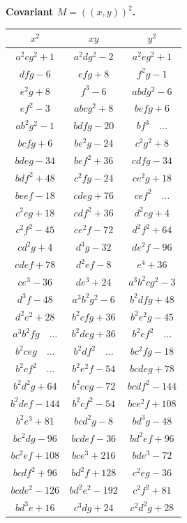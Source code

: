 \documentclass[11pt,a4paper]{article}
\theoremstyle{cayley}
\begin{document}
\textbf{Covariant $M = (\!\!(x,y)\!\!)^{2}$.}
\begin{center}
\small
\begin{tabular}{|c|c|c|}
\hline
$x^{2}$ & $xy$ & $y^{2}$ \\
\hline
$a^{2}cg^{2}+1$ & $a^{2}dg^{2}-2$ & $a^{2}eg^{2}+1$ \\
$dfg-6$ & $efg+8$ & $f^{2}g-1$ \\
$e^{2}g+8$ & $f^{3}-6$ & $abdg^{2}-6$ \\
$ef^{2}-3$ & $abcg^{2}+8$ & $befg+6$ \\
$ab^{2}g^{2}-1$ & $bdfg-20$ & $bf^{3}\quad\dots$ \\
$bcfg+6$ & $be^{2}g-24$ & $c^{2}g^{2}+8$ \\
$bdeg-34$ & $bef^{2}+36$ & $cdfg-34$ \\
$bdf^{2}+48$ & $c^{2}fg-24$ & $ce^{2}g+18$ \\
$beef-18$ & $cdeg+76$ & $cef^{2}\quad\dots$ \\
$c^{2}eg+18$ & $cdf^{2}+36$ & $d^{2}eg+4$ \\
$c^{2}f^{2}-45$ & $ce^{2}f-72$ & $d^{2}f^{2}+64$ \\
$cd^{2}g+4$ & $d^{3}g-32$ & $de^{2}f-96$ \\
$cdef+78$ & $d^{2}ef-8$ & $e^{4}+36$ \\
$ce^{3}-36$ & $de^{3}+24$ & $a^{3}b^{2}cg^{2}-3$ \\
$d^{3}f-48$ & $a^{3}b^{2}g^{2}-6$ & $b^{2}dfg+48$ \\
$d^{2}e^{2}+28$ & $b^{2}cfg+36$ & $b^{2}e^{2}g-45$ \\
$a^{3}b^{2}fg\quad\dots$ & $b^{2}deg+36$ & $b^{2}ef^{2}\quad\dots$ \\
$b^{2}ceg\quad\dots$ & $b^{2}df^{2}\quad\dots$ & $bc^{2}fg-18$ \\
$b^{2}cf^{2}\quad\dots$ & $b^{2}e^{2}f-54$ & $bcdeg+78$ \\
$b^{2}d^{2}g+64$ & $b^{2}ceg-72$ & $bcdf^{2}-144$ \\
$b^{2}def-144$ & $b^{2}cf^{2}-54$ & $bce^{2}f+108$ \\
$b^{2}e^{3}+81$ & $bcd^{2}g-8$ & $bd^{3}g-48$ \\
$bc^{2}dg-96$ & $bcdef-36$ & $bd^{2}ef+96$ \\
$bc^{2}ef+108$ & $bce^{3}+216$ & $bde^{3}-72$ \\
$bcdf^{2}+96$ & $bd^{2}f+128$ & $c^{2}eg-36$ \\
$bcde^{2}-126$ & $bd^{2}e^{2}-192$ & $c^{2}f^{2}+81$ \\
$bd^{3}e+16$ & $c^{3}dg+24$ & $c^{2}d^{2}g+28$ \\

\end{tabular}
\end{center}
\end{document}
